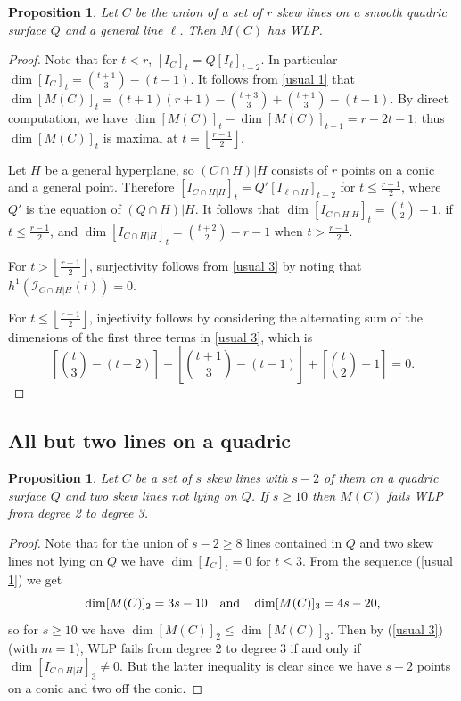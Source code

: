 \documentclass[12pt]{amsart}%
\numberwithin{equation}{section}
\newtheorem{proposition}[theorem]{Proposition}
\theoremstyle{definition}
\numberwithin{equation}{section}
\begin{document}
\begin{proposition}
\label{all but one}
    Let $C$ be the union of a set of $r$ skew lines on a smooth quadric surface $Q$ and a general line $\ell$. Then $M(C)$ has WLP.
\end{proposition}
\begin{proof}
    Note that for $t<r$, $[I_C]_t=Q[I_\ell]_{t-2}$. In particular $\dim [I_{C}]_t={t+1\choose 3}-(t-1)$. It follows from \eqref{usual 1} that $\dim [M(C)]_t=(t+1)(r+1)-{t+3\choose 3}+{t+1\choose 3}-(t-1)$. By direct computation, we have $\dim [M(C)]_t-\dim [M(C)]_{t-1}=r-2t-1$; thus $\dim [M(C)]_t$  is maximal at $t=\left\lfloor \frac{r-1}{2}\right\rfloor$.

    Let $H$ be a general hyperplane, so $(C\cap H)|H$ consists of $r$ points on a conic and a general point. Therefore $[I_{C\cap H|H}]_t=Q'[I_{\ell\cap H}]_{t-2}$ for $t\leq \frac{r-1}{2}$, where $Q'$ is the equation of $(Q\cap H)|H$. It follows that $\dim [I_{C\cap H|H}]_t=
        {t\choose2}-1$, if $ t\leq \frac{r-1}{2}$, and $\dim [I_{C\cap H|H}]_t=
        {t+2\choose 2}-r-1$ when $t>\frac{r-1}{2}.$
    
    For $t>\left\lfloor \frac{r-1}{2}\right\rfloor$, surjectivity follows from \eqref{usual 3} by noting that $h^1(\mathcal I_{C\cap H|H}(t))=0$.

    For $t\leq \left\lfloor \frac{r-1}{2}\right\rfloor$, injectivity follows by considering the alternating sum of the dimensions of the first three terms in \eqref{usual 3}, which is $$\left[{t\choose 3}-(t-2)\right]-\left[{t+1\choose 3}-(t-1)\right]+\left[{t\choose2}-1\right]=0.$$
    
    
\end{proof}

\subsection{All but two lines on a quadric}
\label{subsec: all but two}

\begin{proposition} \label{all but 2}
Let $C$ be a set of $s$ skew lines with $s-2$ of them on a quadric surface $Q$ and two skew lines not lying on $Q$. If $s \geq 10$ then $M(C)$ fails WLP from degree 2 to degree 3.
\end{proposition}

\begin{proof}


Note that for the union of $s-2 \geq 8$ lines  contained in $Q$ and two skew lines not lying on $Q$ we have $\dim [I_C]_t = 0$ for $t \leq 3$.  From the sequence (\ref{usual 1}) we get
\[
\dim [M(C)]_2 = 3s-10 \ \ \hbox{ and } \ \ \dim [M(C)]_3 = 4s-20,
\]
so for $s \geq 10$ we have $\dim [M(C)]_2 \leq \dim [M(C)]_3$. Then by (\ref{usual 3}) (with $m=1$), WLP fails from degree 2 to degree 3 if and only if $\dim [I_{C \cap H | H}]_3 \neq 0$.  But the latter inequality is clear since we have $s-2$ points on a conic and two off the conic.
\end{proof}
\end{document}
